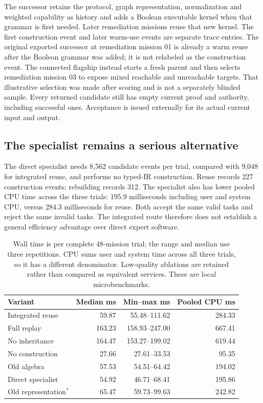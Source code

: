 \documentclass[11pt]{article}
\begin{document}
The successor retains the protocol, graph representation, normalization and weighted capability as history and adds a Boolean executable kernel when that grammar is first needed. Later remediation missions reuse that new kernel. The first construction event and later warm-use events are separate trace entries. The original exported successor at remediation mission 01 is already a warm reuse after the Boolean grammar was added; it is not relabeled as the construction event. The connected flagship instead starts a fresh parent and then selects remediation mission 03 to expose mixed reachable and unreachable targets. That illustrative selection was made after scoring and is not a separately blinded sample. Every returned candidate still has empty current proof and authority, including successful ones. Acceptance is issued externally for its actual current input and output.

\subsection{The specialist remains a serious alternative}

The direct specialist needs 8,562 candidate events per trial, compared with 9,048 for integrated reuse, and performs no typed-IR construction. Reuse records 227 construction events; rebuilding records 312. The specialist also has lower pooled CPU time across the three trials: 195.9 milliseconds including user and system CPU, versus 284.3 milliseconds for reuse. Both accept the same valid tasks and reject the same invalid tasks. The integrated route therefore does not establish a general efficiency advantage over direct expert software.

\begin{table}[htbp]
\centering
\small
\begin{tabularx}{\linewidth}{Yrrr}
\toprule
\textbf{Variant} & \textbf{Median ms} & \textbf{Min--max ms} & \textbf{Pooled CPU ms}\\
\midrule
Integrated reuse & 59.87 & 55.48--111.62 & 284.33\\
Full replay & 163.23 & 158.93--247.00 & 667.41\\
No inheritance & 164.47 & 153.27--199.02 & 619.44\\
No construction & 27.66 & 27.61--33.53 & 95.35\\
Old algebra & 57.53 & 54.51--64.42 & 194.02\\
Direct specialist & 54.92 & 46.71--68.41 & 195.86\\
Old representation$^*$ & 65.47 & 59.73--99.63 & 242.82\\
\bottomrule
\end{tabularx}
\caption{Wall time is per complete 48-mission trial; the range and median use three repetitions. CPU sums user and system time across all three trials, so it has a different denominator. Low-quality ablations are retained rather than compared as equivalent services. These are local microbenchmarks.}
\label{tab:timing}
\end{table}
\end{document}
